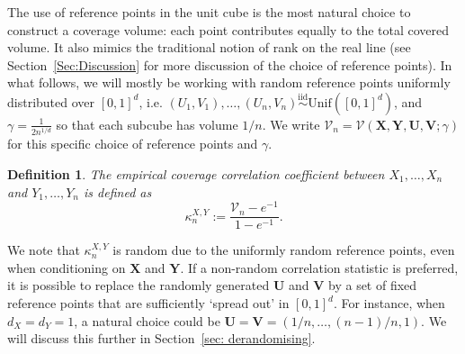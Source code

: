\documentclass[11pt]{article}
\newtheorem{defn}{Definition}
\newcommand{\iid}{\stackrel{\mathrm{iid}}\sim}
\newcommand{\bs}[1]{\boldsymbol{#1}}
\begin{document}
The use of reference points in the unit cube is the most natural choice to construct a coverage volume: each point contributes equally to the total covered volume. It also mimics the traditional notion of rank on the real line (see Section~\ref{Sec:Discussion} for more discussion of the choice of reference points). In what follows, we will mostly be working with random reference points uniformly distributed over $[0, 1]^d$, i.e. $(U_1,V_1),\ldots,(U_n,V_n)\iid \mathrm{Unif}([0,1]^d)$, and $\gamma = \frac{1}{2n^{1/d}}$ so that each subcube has volume $1/n$. We write $\mathcal{V}_n = \mathcal{V}(\bs{X},\bs{Y},\bs{U},\bs{V}; \gamma)$ for this specific choice of reference points and $\gamma$. 
\begin{defn}
\label{def:covcorr}
The \emph{empirical coverage correlation coefficient} between $X_1,\ldots,X_n$ and $Y_1,\ldots,Y_n$ is defined as
\[
\kappa_n^{X, Y}:= \frac{\mathcal{V}_n - e^{-1}}{1 - e^{-1}}.
\]
\end{defn}
We note that $\kappa_n^{X,Y}$ is random due to the uniformly random reference points, even when conditioning on $\bs{X}$ and $\bs{Y}$. If a non-random correlation statistic is preferred, it is possible to replace the randomly generated $\bs{U}$ and $\bs{V}$ by a set of fixed reference points that are sufficiently `spread out' in $[0,1]^d$. For instance, when $d_X=d_Y=1$, a natural choice could be $\bs{U} = \bs{V} = (1/n,\ldots, (n-1)/n, 1)$. We will discuss this further in Section~\ref{sec: derandomising}. 
\end{document}
